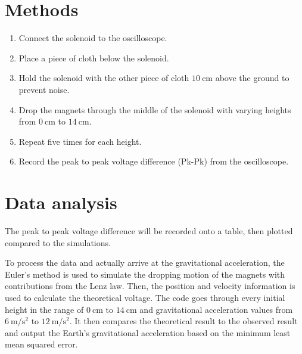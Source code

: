 \section{Methods}

\begin{enumerate}[noitemsep]
	\item Connect the solenoid to the oscilloscope.
	\item Place a piece of cloth below the solenoid.
	\item Hold the solenoid with the other piece of cloth $\qty{10}{\centi\meter}$ above the ground to prevent noise.
	\item Drop the magnets through the middle of the solenoid with varying heights from $\qty{0}{\centi\meter}$ to $\qty{14}{\centi\meter}$.
	\item Repeat five times for each height.
	\item Record the peak to peak voltage difference (Pk-Pk) from the oscilloscope.
\end{enumerate}

\section{Data analysis}
\label{sec:data-analysis}

The peak to peak voltage difference will be recorded onto a table, then plotted compared to the simulations.

To process the data and actually arrive at the gravitational acceleration, the Euler's method is used to simulate the dropping motion of the magnets with contributions from the Lenz law. Then, the position and velocity information is used to calculate the theoretical voltage. The code goes through every initial height in the range of $\qty{0}{\centi\meter}$ to $\qty{14}{\centi\meter}$ and gravitational acceleration values from $\qty{6}{\meter\per\second^2}$ to $\qty{12}{\meter\per\second^2}$. It then compares the theoretical result to the observed result and output the Earth's gravitational acceleration based on the minimum least mean squared error.

